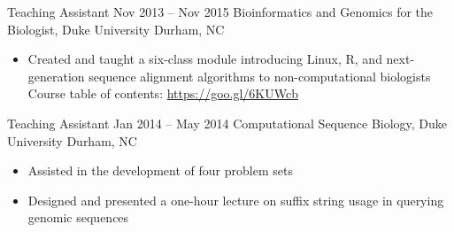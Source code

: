 

\begin{resentries}

  \resentrybeta
    {Teaching Assistant} %
    {Nov 2013 -- Nov 2015} %
    {Bioinformatics and Genomics for the Biologist, Duke University} %
    {Durham, NC} %
    {
      \begin{itemize}[leftmargin=*, itemsep=-1.5mm]
        \item{Created and taught a six-class module introducing Linux, R, and next-generation sequence alignment algorithms to non-computational biologists \xspace \bullet \xspace \xspace Course table of contents: \href{https://goo.gl/6KUWCb}{\color{blue} https://goo.gl/6KUWcb}}
      \end{itemize}
    }

 \resentrybeta
    {Teaching Assistant} %
    {Jan 2014 -- May 2014} %
    {Computational Sequence Biology, Duke University} %
    {Durham, NC} %
    {
      \begin{itemize}[leftmargin=*, itemsep=-1.5mm]
        \item{Assisted in the development of four problem sets}
        \item{Designed and presented a one-hour lecture on suffix string usage in querying genomic sequences}
      \end{itemize}
    }

\end{resentries}
